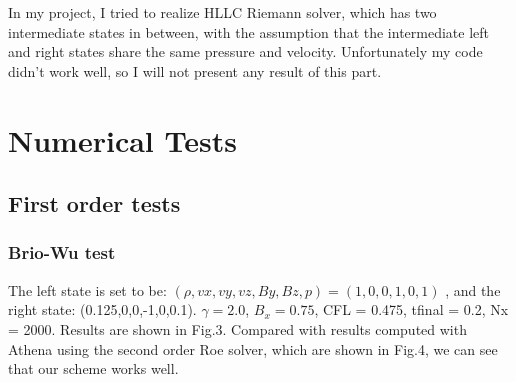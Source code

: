 \documentclass[11pt, oneside]{article}   	%
\begin{document}
In my project, I tried to realize HLLC Riemann solver, which has two intermediate states in between, with the assumption that the intermediate left and right states share the same pressure and velocity. Unfortunately my code didn't work well, so I will not present any result of this part.

\section{Numerical Tests}
\subsection{First order tests}
\subsubsection{Brio-Wu test}
The left state is set to be:  $(\rho, vx, vy, vz, By, Bz, p) = (1,0,0,1,0,1)$ , and the right state: (0.125,0,0,-1,0,0.1). $\gamma = 2.0$, $B_x = 0.75$, CFL = 0.475, tfinal = 0.2, Nx = 2000.  Results are shown in Fig.3. Compared with results computed with Athena using the second order Roe solver, which are shown in Fig.4, we can see that our scheme works well.
\end{document}
